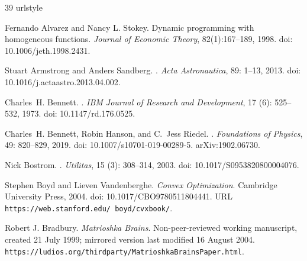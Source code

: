 \documentclass[11pt,a4paper]{article}
\theoremstyle{definition}\newtheorem{definition}{Definition}
\begin{document}
\clearpage
\begin{thebibliography}{39}
\providecommand{\natexlab}[1]{#1}
\providecommand{\url}[1]{\texttt{#1}}
\expandafter\ifx\csname urlstyle\endcsname\relax
  \providecommand{\doi}[1]{doi: #1}\else
  \providecommand{\doi}{doi: \begingroup \urlstyle{rm}\Url}\fi

Fernando Alvarez and Nancy L. Stokey.
\newblock Dynamic programming with homogeneous functions.
\newblock \emph{Journal of Economic Theory}, 82(1):167--189, 1998.
\newblock \doi{10.1006/jeth.1998.2431}.

Stuart Armstrong and Anders Sandberg.
.
\newblock \emph{Acta Astronautica}, 89: 1--13, 2013.
\newblock \doi{10.1016/j.actaastro.2013.04.002}.

Charles~H. Bennett.
.
\newblock \emph{IBM Journal of Research and Development}, 17
  (6): 525--532, 1973.
\newblock \doi{10.1147/rd.176.0525}.

Charles~H. Bennett, Robin Hanson, and C.~Jess Riedel.
.
\newblock \emph{Foundations of Physics}, 49: 820--829, 2019.
\newblock \doi{10.1007/s10701-019-00289-5}.
\newblock arXiv:1902.06730.

Nick Bostrom.
.
\newblock \emph{Utilitas}, 15 (3): 308--314, 2003.
\newblock \doi{10.1017/S0953820800004076}.

Stephen Boyd and Lieven Vandenberghe.
\newblock \emph{{Convex Optimization}}.
\newblock Cambridge University Press, 2004.
\newblock \doi{10.1017/CBO9780511804441}.
\newblock URL \url{https://web.stanford.edu/~boyd/cvxbook/}.

Robert J. Bradbury.
\newblock \emph{Matrioshka Brains}.
\newblock Non-peer-reviewed working manuscript, created 21 July 1999;
mirrored version last modified 16 August 2004.
\newblock \url{https://ludios.org/thirdparty/MatrioshkaBrainsPaper.html}.


\end{thebibliography}
\end{document}
